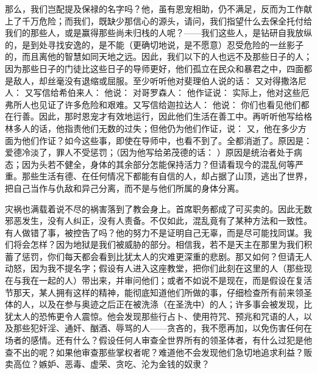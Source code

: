 那么，我们岂配提及保禄的名字吗？他，虽有恩宠相助，仍不满足，反而为工作献上了千万危险；而我们，既缺少那信心的源头，请问，我们指望什么去保全托付给我们的那些人，或是赢得那些尚未归栈的人呢？——我们这些人，是钻研自我放纵的，是到处寻找安逸的，是不能（更确切地说，是不愿意）忍受危险的一丝影子的，而且离他的智慧如同天地之远。因此，我们以下的人也远不及那些日子的人；因为那些日子的门徒比这些日子的导师更好，他们孤立在民众和暴君之中，四面都是敌人，却丝毫没有退缩或屈服。至少听听他对斐理伯人说的话：  又对得撒洛尼人：  又写信给希伯来人： 他说： 对哥罗森人： 他作证说： 实际上，他对这些厄弗所人也见证了许多危险和艰难。又写信给迦拉达人： 他说： 你们也看见他们都在行善。因此，那时恩宠才有效地运行，因此他们生活在善工中。再听听他写给格林多人的话，他指责他们无数的过失；但他仍为他们作证，说： 又，他在多少方面为他们作证？如今这些事，即使在导师中，也看不到了。全都消逝了。原因是：爱德冷淡了，罪人不受惩罚；（因为他写给弟茂德的话： ）原因是统治者处于病态；因为头若不健全，身体的其余部分怎能保持活力？但请看现今的混乱何等严重。那些生活有德、在任何情况下都能有自信的人，却占据了山顶，逃出了世界，把自己当作与仇敌和异己分离，而不是与他们所属的身体分离。\par

灾祸也满载着说不尽的祸害落到了教会身上。首席职务都成了可买卖的。因此无数邪恶发生，没有人纠正，没有人责备。不仅如此，混乱竟有了某种方法和一致性。有人做错了事，被控告了吗？他的努力不是证明自己无辜，而是尽可能找同谋。我们将会怎样？因为地狱是我们被威胁的部分。相信我，若不是天主在那里为我们积蓄了惩罚，你们每天都会看到比犹太人的灾难更深重的悲剧。那又如何？但请无人动怒，因为我不提名字；假设有人进入这座教堂，把你们此刻在这里的人（那些现在与我在一起的人）带出来，并审问他们；或者不如说不是现在，而是假设在复活节那天，某人拥有这样的精神，能彻底知道他们所做的事，仔细检查所有前来领圣体的人，以及在参与奥迹之后正在被洗涤（在圣洗中）的人；许多事会被发现，比犹太人的恐怖更令人震惊。他会发现那些行占卜、使用符咒、预兆和咒语的人，以及那些犯奸淫、通奸、酗酒、辱骂的人——贪吝的，我不愿再加，以免伤害任何在场者的感情。还有什么？假设任何人审查全世界所有的领圣体者，有什么过犯是他查不出的呢？如果他审查那些掌权者呢？难道他不会发现他们急切地追求利益？贩卖高位？嫉妒、恶毒、虚荣、贪吃、沦为金钱的奴隶？\par

